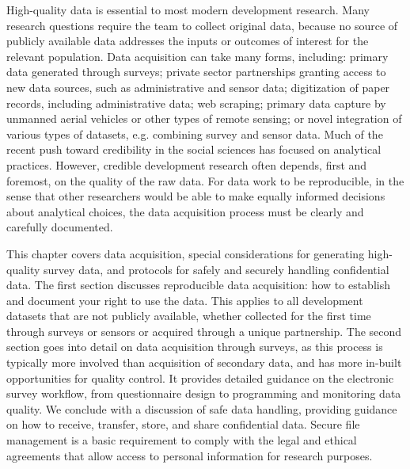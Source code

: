 
\begin{fullwidth}
High-quality data is essential to most modern development research.
Many research questions require the team to collect original data,
because no source of publicly available data addresses the
inputs or outcomes of interest for the relevant population.
Data acquisition can take many forms, including:
primary data generated through surveys;
private sector partnerships granting access to new data sources, such as administrative and sensor data;
digitization of paper records, including administrative data; web scraping;
primary data capture by unmanned aerial vehicles or other types of remote sensing;
or novel integration of various types of datasets, e.g. combining survey and sensor data.
Much of the recent push toward credibility in the social sciences has focused on analytical practices.
However, credible development research often depends, first and foremost, on the quality of the raw data.
For data work to be reproducible,
in the sense that other researchers would be able to make
equally informed decisions about analytical choices,
the data acquisition process must be clearly and carefully documented.

This chapter covers data acquisition,
special considerations for generating high-quality survey data,
and protocols for safely and securely handling confidential data.
The first section discusses reproducible data acquisition:
how to establish and document your right to use the data.
This applies to all development datasets that are not publicly available,
whether collected for the first time through surveys or sensors or acquired through a unique partnership.
The second section goes into detail on data acquisition through surveys,
as this process is typically more involved than acquisition of secondary data,
and has more in-built opportunities for quality control.
It provides detailed guidance on the electronic survey workflow,
from questionnaire design to programming and monitoring data quality.
We conclude with a discussion of safe data handling,
providing guidance on how to receive, transfer, store, and share confidential data.
Secure file management is a basic requirement to comply with the legal and
ethical agreements that allow  access to personal information for research purposes.


\end{fullwidth}

